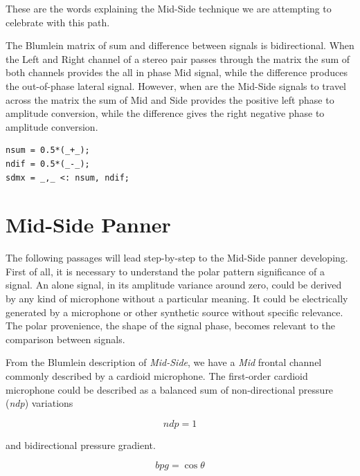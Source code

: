 \documentclass{article}
\begin{document}
These are the words explaining the Mid-Side technique we are attempting to celebrate with this path.  

The Blumlein matrix of sum and difference between signals is bidirectional. When the Left and Right channel of a stereo pair passes through the matrix the sum of both channels provides the all in phase Mid signal, while the difference produces the out-of-phase lateral signal. However, when are the Mid-Side signals to travel across the matrix the sum of Mid and Side provides the positive left phase to amplitude conversion, while the difference gives the right negative phase to amplitude conversion. 

\begin{lstlisting}
nsum = 0.5*(_+_);
ndif = 0.5*(_-_);
sdmx = _,_ <: nsum, ndif;
\end{lstlisting}

\section{Mid-Side Panner}
\label{sec:mspanner}

The following passages will lead step-by-step to the Mid-Side panner developing. First of all, it is necessary to understand the polar pattern significance of a signal. An alone signal, in its amplitude variance around zero, could be derived by any kind of microphone without a particular meaning. It could be electrically generated by a microphone or other synthetic source without specific relevance. The polar provenience, the shape of the signal phase, becomes relevant to the comparison between signals.

From the Blumlein description of \emph{Mid-Side}, we have a \emph{Mid} frontal channel commonly described by a cardioid microphone. The first-order cardioid microphone could be described as a balanced sum of non-directional pressure (\emph{ndp}) variations

\begin{equation}
ndp = 1
\label{eq:omni}
\end{equation}

and bidirectional pressure gradient.

\begin{equation}
bpg = \cos\theta
\label{eq:fig8}
\end{equation}
\end{document}
